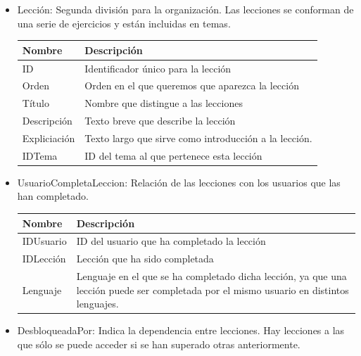 \begin{itemize}
\item Lección: Segunda división para la organización. Las lecciones se conforman de una serie de ejercicios y están incluidas en temas.

\begin{tabularx}{15cm}{|l|X|}
\hline
\textbf{Nombre} & \textbf{Descripción}                                                              \\ \hline
ID              & Identificador único para la lección                                         \\ \hline
Orden        & Orden en el que queremos que aparezca la lección \\ \hline
Título      & Nombre que distingue a las lecciones \\ \hline
Descripción              & Texto breve que describe la lección                                         \\ \hline
Expliciación        & Texto largo que sirve como introducción a la lección.  \\ \hline
IDTema      & ID del tema al que pertenece esta lección \\ \hline
\end{tabularx}
\vspace{1em}

\item UsuarioCompletaLeccion: Relación de las lecciones con los usuarios que las han completado.

\begin{tabularx}{15cm}{|l|X|}
\hline
\textbf{Nombre} & \textbf{Descripción}                                                              \\ \hline
IDUsuario       & ID del usuario que ha completado la lección                                                          \\ \hline
IDLección     & Lección que ha sido completada                                           \\ \hline
Lenguaje            & Lenguaje en el que se ha completado dicha lección, ya que una lección puede ser completada por el mismo usuario en distintos lenguajes. \\ \hline
\end{tabularx}
\vspace{1em}

\item DesbloqueadaPor: Indica la dependencia entre lecciones. Hay lecciones a las que sólo se puede acceder si se han superado otras anteriormente.


\end{itemize}
